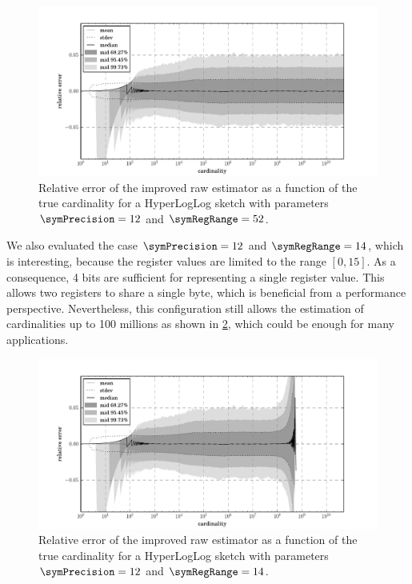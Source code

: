 \documentclass[a4paper]{scrartcl}
\begin{document}
\begin{figure}
\centering
\includegraphics[width=1\textwidth]{raw_corrected_estimate_12_52}
\caption{Relative error of the improved raw estimator as a function of the true cardinality for a HyperLogLog sketch with parameters $\symPrecision = 12$ and $\symRegRange=52$.}
\label{fig:raw_corrected_estimation_error_12_52}
\end{figure}

We also evaluated the case $\symPrecision = 12$ and $\symRegRange=14$, which is interesting, because the register values are limited to the range $[0, 15]$. As a consequence, 4 bits are sufficient for representing a single register value. This allows two registers to share a single byte, which is beneficial from a performance perspective. Nevertheless, this configuration still allows the estimation of cardinalities up to 100 millions as shown in \cref{fig:raw_corrected_estimation_error_12_14}, which could be enough for many applications.

\begin{figure}
\centering
\includegraphics[width=1\textwidth]{raw_corrected_estimate_12_14}
\caption{Relative error of the improved raw estimator as a function of the true cardinality for a HyperLogLog sketch with parameters $\symPrecision = 12$ and $\symRegRange=14$.}
\label{fig:raw_corrected_estimation_error_12_14}
\end{figure}
\end{document}
